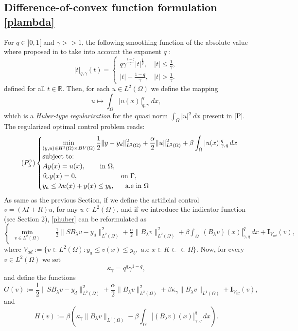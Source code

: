 \documentclass[11pt,a4paper]{amsart}
\renewcommand{\l}{\left}
\renewcommand{\r}{\right}
\newcommand{\om}{\Omega}
\newcommand{\norm}[1]{\lVert #1 \rVert}
\begin{document}
\subsection{Difference-of-convex function formulation \eqref{plambda}}

For $q\in ]0, 1[$ and $\gamma>>1$, the following smoothing function of the absolute value where proposed in \cite{merino} to take into account the exponent $q$ :
\[
|t|_{q,\gamma}(t)=\begin{cases}
q\gamma^{\frac{1-q}{q}}|t|^{\frac{1}{q}}, & |t|\le \frac{1}{\gamma},\\ 
|t|-\frac{1-q}{\gamma}, & |t|>\frac{1}{\gamma}.
\end{cases}
\]
defined for all $t\in \mathbb{R}$. Then, for each $u\in L^2(\om)$ we define the mapping
\[
u \mapsto\int_{\om}|u(x)|_{q,\gamma}^q\; dx,
\]
which is a \textit{Huber-type regularization} for the quasi norm $\int_{\om}|u|^q\; dx$ present in \eqref{P}.
The regularized  optimal control problem reads:
\begin{equation}\tag{$P^\gamma_{\lambda}$} \label{phuber}
    \begin{cases}
    \displaystyle\min_{(y,u)\in H^1(\om)\times BV(\om)} \frac{1}{2}\norm{y-y_d}^2_{L^2(\om)}+\frac{\alpha}{2}\norm{u}^2_{L^2(\om)}+\beta\int_{\om}|u(x)|_{\gamma,q}^q \,dx\\
    \mbox{subject to:}\\
    Ay(x)=u(x), \phantom{aaaa} \mbox{in } \om,\\
    \partial_{\nu}y(x)=0, \phantom{aaaaaaaaaaaa} \mbox{on } \Gamma,\\
   y_a\le\lambda u(x)+y(x)\le y_b, \phantom{aaa} \mbox{a.e in }\om 
    \end{cases}
\end{equation}
As same as the previous Section, if we define the artificial control $v=(\lambda I+R)u$, for any $u\in L^2(\om)$, and if we introduce the indicator function (see Section 2), \eqref{phuber} can be reformulated as 
\[
	\begin{cases}
		\displaystyle \min_{v\in L^{2}(\om)} \qquad  \frac{1}{2}\norm{S	B_{\lambda}v-y_d}_{L^2(\om)}^2+\frac{\alpha}{2}\norm{	B_{\lambda}v}_{L^2(\om)}^2+\beta\int_{\om}|(B_\lambda v)(x)|_{\gamma,q}^q \,dx+\mathbf{I}_{V_{ad}}(v),
		\end{cases}
\]
where $ V_{ad}:=\{v\in L^2(\om): y_a\le v(x)\le y_b, \mbox{ a.e }x\in K\subset\subset\om \}$. Now, for every $v\in L^2(\om)$ we set 
$$\kappa_\gamma = q^{q}\gamma^{1-q},$$
and define the functions
\begin{equation}\label{convexI}
	G(v):=\frac{1}{2}\norm{S	B_{\lambda}v-y_d}_{L^2(\om)}^2+\frac{\alpha}{2}\norm{	B_{\lambda}v}_{L^2(\om)}^2+\beta\kappa_{\gamma}\norm{B_{\lambda}v}_{L^{1}(\om)}+\mathbf{I}_{V_{ad}}(v),
\end{equation}
and
\begin{equation}\label{convexII}
	H(v):=\beta \l(\kappa_{\gamma}\norm{B_{\lambda}v}_{L^{1}(\om)}-\beta\int_{\om}|(B_\lambda v)(x)|_{\gamma,q}^q \,dx\r).
\end{equation}
\end{document}
